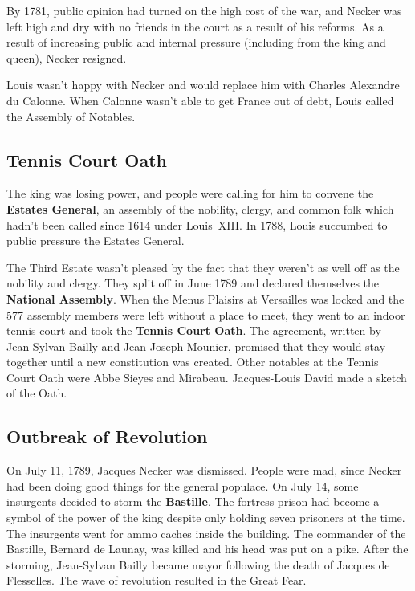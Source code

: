 By 1781, public opinion had turned on the high cost of the war,
and Necker was left high and dry with no friends in the court as a result of his reforms.
As a result of increasing public and internal pressure (including from the king and queen), Necker resigned.

Louis wasn't happy with Necker and would replace him with Charles Alexandre du Calonne.
When Calonne wasn't able to get France out of debt, Louis called the Assembly of Notables.

\subsection*{Tennis Court Oath}

The king was losing power, and people were calling for him to convene the \textbf{Estates General},
an assembly of the nobility, clergy, and common folk which hadn't been called since 1614 under Louis~XIII\@.
In 1788, Louis succumbed to public pressure the Estates General.

The Third Estate wasn't pleased by the fact that they weren't as well off as the nobility and clergy.
They split off in June 1789 and declared themselves the \textbf{National Assembly}.
When the Menus Plaisirs at Versailles was locked and the 577 assembly members were left without a place to meet,
they went to an indoor tennis court and took the \textbf{Tennis Court Oath}.
The agreement, written by Jean-Sylvan Bailly and Jean-Joseph Mounier,
promised that they would stay together until a new constitution was created.
Other notables at the Tennis Court Oath were Abbe Sieyes and Mirabeau.
Jacques-Louis David made a sketch of the Oath.

\subsection*{Outbreak of Revolution}

On July 11, 1789, Jacques Necker was dismissed.
People were mad, since Necker had been doing good things for the general populace.
On July 14, some insurgents decided to storm the \textbf{Bastille}.
The fortress prison had become a symbol of the power of the king despite only holding seven prisoners at the time.
The insurgents went for ammo caches inside the building.
The commander of the Bastille, Bernard de Launay, was killed and his head was put on a pike.
After the storming, Jean-Sylvan Bailly became mayor following the death of Jacques de Flesselles.
The wave of revolution resulted in the Great Fear.

